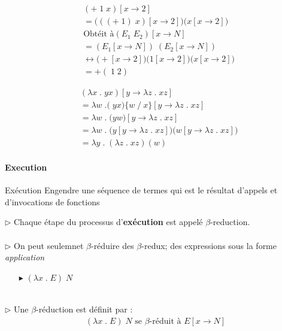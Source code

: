 \documentclass{report}
\begin{document}
\begin{multicols*}{3}
\begin{EExample}{}{}
      \begin{align*}
        & (+ \; 1 \; x)[x \rightarrow 2] 
        \\
        &= 
        \bigl(((+ \; 1) \; x) [x \rightarrow 2] \bigr) 
        \bigl( x [x \rightarrow 2] \bigr)  \\
        & \text{Obtéit à} 
        (E_1 \; E_2) [x \rightarrow N]
        \\
        &= 
        (E_1 [x \rightarrow N]) \; (E_2 [x \rightarrow N])\\
        &\leftrightarrow 
        \bigl(+ [x \rightarrow 2] \bigr)         
        \bigl(1 [x \rightarrow 2] \bigr)         
        \bigl(x [x \rightarrow 2] \bigr) \\ &= + (\; 1 \; 2)
      \end{align*}

      \begin{align*}
        &(\lambda x \; . \; y x)[y \rightarrow \lambda z \; . \; x z]
        \\
        &= 
        \lambda w \; . 
        \bigl(\; y x\bigr) \{ w \; /\ x \}
        [y \rightarrow \lambda z \; . \; x z]
        \\ 
        &= \lambda w \; . \; \bigl( yw \bigr)
        [y \rightarrow \lambda z \; . \; x z]
        \\ 
        &= \lambda w \; . \; 
        \bigl( y 
        [y \rightarrow \lambda z \; . \; x z]\bigr)
        \bigl(w [y \rightarrow \lambda z \; . \; x z] \bigr)
        \\ 
        &= \lambda y \; . \; 
        (\lambda z \; . \; xz) (w)
      \end{align*}
  \end{EExample}

  \paragraph{Execution}
  \mbox{}
  \vspace{0.5em}

  \begin{Definitionx}{Exécution}{}
      Engendre une séquence de termes qui est le résultat 
      d'appels et d'invocations de fonctions
  \end{Definitionx}

  \noindent
  $\rhd$ Chaque étape du processus d'\textbf{exécution} 
  est appelé $\beta$-reduction. 
  \mbox{}\\ \\
  $\rhd$ On peut seulemnet $\beta$-réduire des 
  \textbf{$\beta$}-redux; des expressions sous la forme 
  \textit{application}  
  \begin{itemize}
    \item [$\blacktriangleright$ ] $(\lambda x \; . \; E) \; N$
  \end{itemize}
  \mbox{}\\
  $\rhd$ Une $\beta$-réduction est définit par :
  \begin{align*}
      (\lambda x \; . \; E) \; N 
      \text{ se } \beta\text{-réduit à } E[x \rightarrow N]
  \end{align*}




\end{multicols*}
\end{document}
